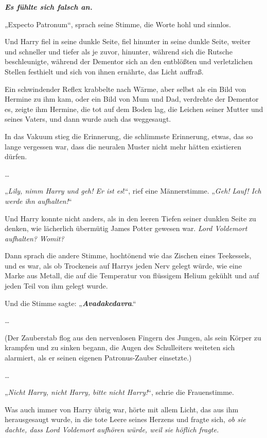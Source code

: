 {\textbf{\emph{Es fühlte sich falsch an.}}

„Expecto Patronum“, sprach seine Stimme, die Worte hohl und sinnlos.

Und Harry fiel in seine dunkle Seite, fiel hinunter in seine dunkle Seite, weiter und schneller und tiefer als je zuvor, hinunter, während sich die Rutsche beschleunigte, während der Dementor sich an den entblößten und verletzlichen Stellen festhielt und sich von ihnen ernährte, das Licht auffraß.

Ein schwindender Reflex krabbelte nach Wärme, aber selbst als ein Bild von Hermine zu ihm kam, oder ein Bild von Mum und Dad, verdrehte der Dementor es, zeigte ihm Hermine, die tot auf dem Boden lag, die Leichen seiner Mutter und seines Vaters, und dann wurde auch das weggesaugt.

In das Vakuum stieg die Erinnerung, die schlimmste Erinnerung, etwas, das so lange vergessen war, dass die neuralen Muster nicht mehr hätten existieren dürfen.

…

„\emph{Lily, nimm Harry und geh! Er ist es}!“, rief eine Männerstimme. „\emph{Geh! Lauf! Ich werde ihn aufhalten!}“

Und Harry konnte nicht anders, als in den leeren Tiefen seiner dunklen Seite zu denken, wie lächerlich übermütig James Potter gewesen war. \emph{Lord Voldemort aufhalten? Womit?}

Dann sprach die andere Stimme, hochtönend wie das Zischen eines Teekessels, und es war, als ob Trockeneis auf Harrys jeden Nerv gelegt würde, wie eine Marke aus Metall, die auf die Temperatur von flüssigem Helium gekühlt und auf jeden Teil von ihm gelegt wurde.

Und die Stimme sagte: „\textbf{\emph{Avadakedavra}}.“

…

(Der Zauberstab flog aus den nervenlosen Fingern des Jungen, als sein Körper zu krampfen und zu sinken begann, die Augen des Schulleiters weiteten sich alarmiert, als er seinen eigenen Patronus-Zauber einsetzte.)

…

„\emph{Nicht Harry, nicht Harry, bitte nicht Harry!}“, schrie die Frauenstimme.

Was auch immer von Harry übrig war, hörte mit allem Licht, das aus ihm herausgesaugt wurde, in die tote Leere seines Herzens und fragte sich, \emph{ob sie dachte, dass Lord Voldemort aufhören würde, weil sie höflich fragte.}

}

